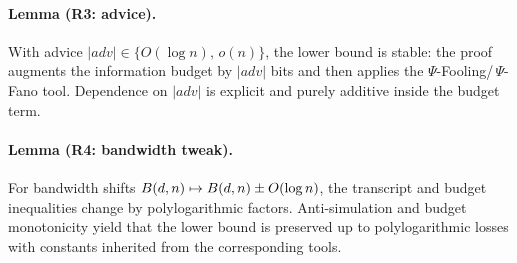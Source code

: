 \paragraph{Lemma (R3: advice).}\label{lem:R3-advice}
With advice $|adv| \in \{O(\log n),\, o(n)\}$, the lower bound is stable: the proof augments the information budget by $|adv|$ bits and then applies the $\Psi$-Fooling/\,$\Psi$-Fano tool. Dependence on $|adv|$ is explicit and purely additive inside the budget term.

\paragraph{Lemma (R4: bandwidth tweak).}\label{lem:R4-bandwidth-tweak}
For bandwidth shifts $\B(d,n) \mapsto \B(d,n) \pm O(\log n)$, the transcript and budget inequalities change by polylogarithmic factors. Anti-simulation and budget monotonicity yield that the lower bound is preserved up to polylogarithmic losses with constants inherited from the corresponding tools.